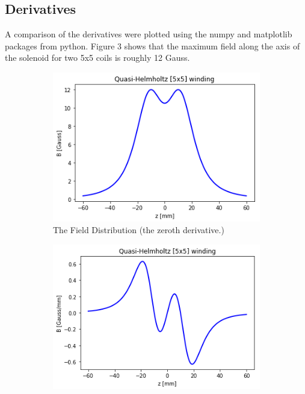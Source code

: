 \documentclass[%
 reprint,
 amsmath,
 amssymb,
 aps,
]{revtex4-1}
\begin{document}
	\subsection{\label{sec:level2} Derivatives}
	
	A comparison of the derivatives were plotted using the numpy and matplotlib packages from python. Figure 3 shows that the maximum field along the axis of the solenoid for two 5x5 coils is roughly 12 Gauss.
        
        \begin{figure}
            \centering
            \begin{subfigure}[b]{0.3\textwidth}
                \centering
                \includegraphics[width=\textwidth]{mag0.png}
                \caption{The Field Distribution (the zeroth derivative.)}
                \label{fig:y equals x}
            \end{subfigure}
            \hfill
            \begin{subfigure}[b]{0.3\textwidth}
                \centering
                \includegraphics[width=\textwidth]{mag1.png}

\end{subfigure}
\end{figure}
\end{document}
